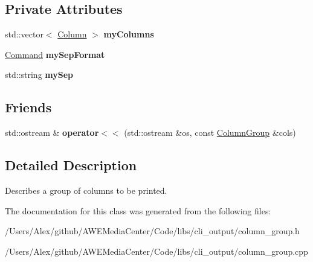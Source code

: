 \subsection*{Private Attributes}
\begin{DoxyCompactItemize}
\item 
\hypertarget{class_t_c_o_m_1_1_column_group_ac8df215a8e76fc2172cb03115506e48c}{std\-::vector$<$ \hyperlink{class_t_c_o_m_1_1_column}{Column} $>$ {\bfseries my\-Columns}}\label{class_t_c_o_m_1_1_column_group_ac8df215a8e76fc2172cb03115506e48c}

\item 
\hypertarget{class_t_c_o_m_1_1_column_group_a72e093bf110b4daae8c93a5105ff650a}{\hyperlink{class_t_c_o_m_1_1_command}{Command} {\bfseries my\-Sep\-Format}}\label{class_t_c_o_m_1_1_column_group_a72e093bf110b4daae8c93a5105ff650a}

\item 
\hypertarget{class_t_c_o_m_1_1_column_group_acb31f17d457a19f4d9a2d1a2d91b8282}{std\-::string {\bfseries my\-Sep}}\label{class_t_c_o_m_1_1_column_group_acb31f17d457a19f4d9a2d1a2d91b8282}

\end{DoxyCompactItemize}
\subsection*{Friends}
\begin{DoxyCompactItemize}
\item 
\hypertarget{class_t_c_o_m_1_1_column_group_a7d9ea42f7c39227ae96e0ea7bc443204}{std\-::ostream \& {\bfseries operator$<$$<$} (std\-::ostream \&os, const \hyperlink{class_t_c_o_m_1_1_column_group}{Column\-Group} \&cols)}\label{class_t_c_o_m_1_1_column_group_a7d9ea42f7c39227ae96e0ea7bc443204}

\end{DoxyCompactItemize}


\subsection{Detailed Description}
Describes a group of columns to be printed. 

The documentation for this class was generated from the following files\-:\begin{DoxyCompactItemize}
\item 
/\-Users/\-Alex/github/\-A\-W\-E\-Media\-Center/\-Code/libs/cli\-\_\-output/column\-\_\-group.\-h\item 
/\-Users/\-Alex/github/\-A\-W\-E\-Media\-Center/\-Code/libs/cli\-\_\-output/column\-\_\-group.\-cpp\end{DoxyCompactItemize}
